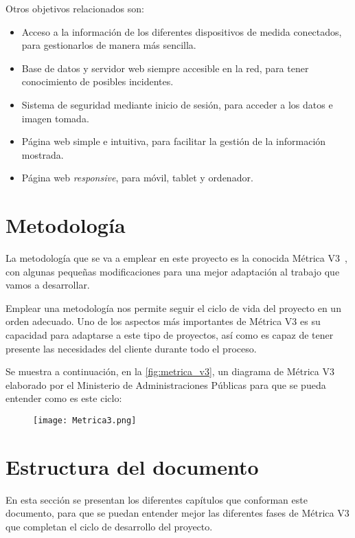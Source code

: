Otros objetivos relacionados son:
\begin{itemize}
	\item Acceso a la información de los diferentes dispositivos de medida conectados, para gestionarlos de manera más sencilla.
	      \pagebreak
	      
	\item Base de datos y servidor web siempre accesible en la red, para tener conocimiento de posibles incidentes.
	\item Sistema de seguridad mediante inicio de sesión, para acceder a los datos e imagen tomada.
	\item Página web simple e intuitiva, para facilitar la gestión de la información mostrada.
	\item Página web \textit{responsive}, para móvil, tablet y ordenador.
\end{itemize}

\section{Metodología}\label{sec:metodologia}
La metodología que se va a emplear en este proyecto es la conocida Métrica V3~\cite{secretaria_general_de_administracion_digital_metrica_nodate}, con algunas pequeñas modificaciones para una mejor adaptación al trabajo que vamos a desarrollar.

Emplear una metodología nos permite seguir el ciclo de vida del proyecto en un orden adecuado. Uno de los aspectos más importantes de Métrica V3 es su capacidad para adaptarse a este tipo de proyectos, así como es capaz de tener presente las necesidades del cliente durante todo el proceso.

Se muestra a continuación, en la \autoref{fig:metrica_v3}, un diagrama de Métrica V3 elaborado por el Ministerio de Administraciones Públicas para que se pueda entender como es este ciclo:

\begin{figure}[H]
	{\texttt{[image: Metrica3.png]}}
\end{figure}

\section{Estructura del documento}\label{sec:estructura-del-documento}
En esta sección se presentan los diferentes capítulos que conforman este documento, para que se puedan entender mejor las diferentes fases de Métrica V3 que completan el ciclo de desarrollo del proyecto. 

